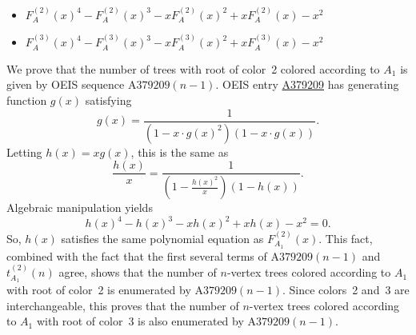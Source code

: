 \documentclass[12pt]{amsart}
\newcommand{\seqnum}[1]{\href{https://oeis.org/#1}{#1}}
\newcommand{\gff}[2]{F_{#2}^{(#1)}(x)}
\newcommand{\gfa}[1]{\gff{#1}{A}}
\begin{document}
\begin{description}
\begin{itemize}
\item $\gfa{2}^4-\gfa{2}^3-x\gfa{2}^2+x\gfa{2}-x^2$


\item $\gfa{3}^4-\gfa{3}^3-x\gfa{3}^2+x\gfa{3}-x^2$


\end{itemize}
    \item[Discussion]
    We prove that the number of trees with root of color~2 colored according to $A_1$ is given by OEIS sequence $\text{A379209}(n-1)$.
    OEIS entry \seqnum{A379209} has generating function $g(x)$ satisfying
    \[
    g(x) = \frac{1}{\left(1-x\cdot g(x)^2\right)\left(1-x\cdot g(x)\right)}.
    \]
    Letting $h(x)=xg(x)$, this is the same as
    \[
    \frac{h(x)}{x} = \frac{1}{\left(1-\frac{h(x)^2}{x}\right)\left(1-h(x)\right)}.
    \]
    Algebraic manipulation yields
    \[
    h(x)^4-h(x)^3-xh(x)^2+xh(x)-x^2=0.
    \]
    So, $h(x)$ satisfies the same polynomial equation as $\gff{2}{A_1}$. This fact, combined with the fact that the first several terms of $\text{A379209}(n-1)$ and $t_{A_1}^{(2)}(n)$ agree, shows that the number of $n$-vertex trees colored according to $A_1$ with root of color~2 is enumerated by $\text{A379209}(n-1)$. Since colors~2 and~3 are interchangeable, this proves that the number of $n$-vertex trees colored according to $A_1$ with root of color~3 is also enumerated by $\text{A379209}(n-1)$.
\end{description}
\end{document}
